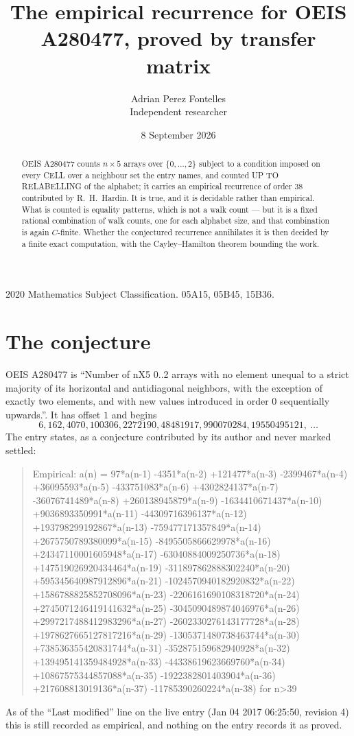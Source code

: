\documentclass[11pt,a4paper]{article}
\title{The empirical recurrence for OEIS A280477, proved by transfer matrix}
\author{Adrian Perez Fontelles\\ \small Independent researcher}
\date{8 September 2026}
\theoremstyle{plain}
\theoremstyle{definition}
\begin{document}
\maketitle

\begin{abstract}
OEIS A280477 counts $n\times5$ arrays over $\{0,\dots,2\}$ subject to a condition imposed on
every CELL over a neighbour set the entry names, and counted UP TO RELABELLING of the
alphabet; it carries an empirical recurrence of order $38$ contributed by
R.~H.~Hardin. It is true, and it is decidable rather than empirical. What is counted is
equality patterns, which is not a walk count --- but it is a fixed rational combination of
walk counts, one for each alphabet size, and that combination is again $C$-finite. Whether the
conjectured recurrence annihilates it is then decided by a finite exact computation, with the
Cayley--Hamilton theorem bounding the work.
\end{abstract}

\noindent\small 2020 Mathematics Subject Classification. 05A15, 05B45, 15B36.\normalsize

\section{The conjecture}

OEIS A280477 is ``Number of nX5 0..2 arrays with no element unequal to a strict majority of its horizontal and antidiagonal neighbors, with the exception of exactly two elements, and with new values introduced in order 0 sequentially upwards.''. It has offset $1$ and begins
\[
6, 162, 4070, 100306, 2272190, 48481917, 990070284, 19550495121,\ \dots
\]
The entry states, as a conjecture contributed by its author and never marked settled:
\begin{quote}
Empirical: a(n) = 97*a(n-1) -4351*a(n-2) +121477*a(n-3) -2399467*a(n-4) +36095593*a(n-5) -433751083*a(n-6) +4302824137*a(n-7) -36076741489*a(n-8) +260138945879*a(n-9) -1634410671437*a(n-10) +9036893350991*a(n-11) -44309716396137*a(n-12) +193798299192867*a(n-13) -759477171357849*a(n-14) +2675750789380099*a(n-15) -8495505866629978*a(n-16) +24347110001605948*a(n-17) -63040884009250736*a(n-18) +147519026920434464*a(n-19) -311897862888302240*a(n-20) +595345640987912896*a(n-21) -1024570940182920832*a(n-22) +1586788825852708096*a(n-23) -2206161690108318720*a(n-24) +2745071246419141632*a(n-25) -3045090489874046976*a(n-26) +2997217488412983296*a(n-27) -2602330276143177728*a(n-28) +1978627665127817216*a(n-29) -1305371480738463744*a(n-30) +738536355420831744*a(n-31) -352875159682940928*a(n-32) +139495141359484928*a(n-33) -44338619623669760*a(n-34) +10867575344857088*a(n-35) -1922382801403904*a(n-36) +217608813019136*a(n-37) -11785390260224*a(n-38) for n>39
\end{quote}
As of the ``Last modified'' line on the live entry (Jan 04 2017 06:25:50, revision 4) this is still
recorded as empirical, and nothing on the entry records it as proved.
\end{document}
